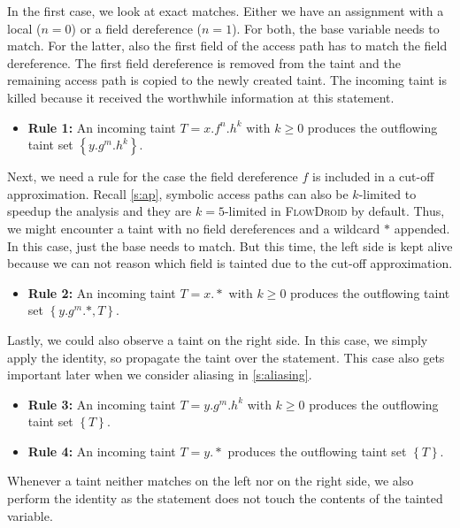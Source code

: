 \documentclass[../draft.tex]{subfiles}
\begin{document}
    In the first case, we look at exact matches. Either we have an assignment with a local ($n=0$) or a field dereference ($n=1$). For both, the base variable needs to match. For the latter, also the first field of the access path has to match the field dereference.
    The first field dereference is removed from the taint and the remaining access path is copied to the newly created taint. The incoming taint is killed because it received the worthwhile information at this statement.
    \begin{itemize}
        \item[] \textbf{Rule 1:} An incoming taint $T = x.f^n.h^k$ with $k \geq 0$ produces the outflowing taint set $\left\{y.g^m.h^k\right\}$.
    \end{itemize} 

    Next, we need a rule for the case the field dereference $f$ is included in a cut-off approximation. Recall \autoref{s:ap}, symbolic access paths can also be $k$-limited to speedup the analysis and they are $k=5$-limited in \textsc{FlowDroid} by default. Thus, we might encounter a taint with no field dereferences and a wildcard $*$ appended. In this case, just the base needs to match. But this time, the left side is kept alive because we can not reason which field is tainted due to the cut-off approximation.
    \begin{itemize}
        \item[] \textbf{Rule 2:} An incoming taint $T = x.*$ with $k \geq 0$ produces the outflowing taint set $\left\{y.g^m.*, T\right\}$.
    \end{itemize} 

    Lastly, we could also observe a taint on the right side. In this case, we simply apply the identity, so propagate the taint over the statement. This case also gets important later when we consider aliasing in \autoref{s:aliasing}.
    \begin{itemize}
        \item[] \textbf{Rule 3:} An incoming taint $T = y.g^m.h^k$ with $k \geq 0$ produces the outflowing taint set $\left\{T\right\}$.
        \item[] \textbf{Rule 4:} An incoming taint $T = y.*$ produces the outflowing taint set $\left\{T\right\}$.
    \end{itemize}

    Whenever a taint neither matches on the left nor on the right side, we also perform the identity as the statement does not touch the contents of the tainted variable.  
\end{document}
